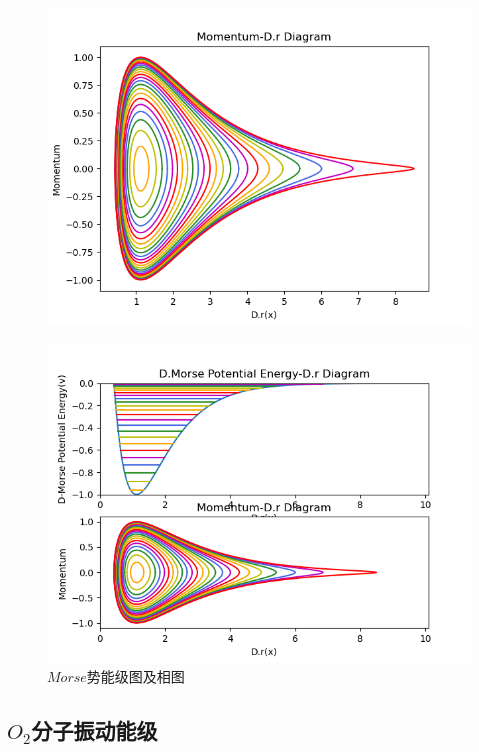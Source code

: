\documentclass[11pt, a4paper, oneside]{ctexart}
\begin{document}
{{{\begin{appendices}
{\begin{figure}[!ht]
            \centering
            \includegraphics[scale=0.75]{dh-2.png}
        \end{figure} 
        \begin{figure}[!ht]
            \caption{ $Morse$势能级图及相图}
	
            \centering
            \includegraphics[scale=0.75]{dh-3.png}
        \end{figure} 
    }
    \newpage
    \subsection{$O_2$分子振动能级}
    {
}
\end{appendices}}}}
\end{document}
